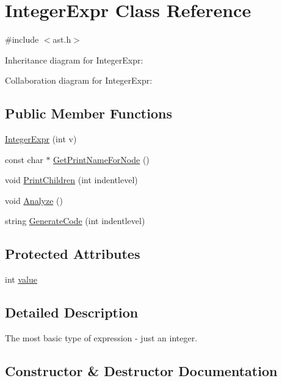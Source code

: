 \hypertarget{class_integer_expr}{}\section{Integer\+Expr Class Reference}
\label{class_integer_expr}


{\ttfamily \#include $<$ast.\+h$>$}



Inheritance diagram for Integer\+Expr\+:


Collaboration diagram for Integer\+Expr\+:
\subsection*{Public Member Functions}
\begin{DoxyCompactItemize}
\item 
\hyperlink{class_integer_expr_a4049bed3df13d005535e73fafe6b1516}{Integer\+Expr} (int v)
\item 
const char $\ast$ \hyperlink{class_integer_expr_a76e0e8357539e515ddac3192ab595fc8}{Get\+Print\+Name\+For\+Node} ()
\item 
void \hyperlink{class_integer_expr_ae8dfeab6ece069ed29c80a5614548268}{Print\+Children} (int indentlevel)
\item 
void \hyperlink{class_integer_expr_a523ca156f0653534b5c142fd496de7a4}{Analyze} ()
\item 
string \hyperlink{class_integer_expr_a72e48794bcd8c04bfeea19d1057636be}{Generate\+Code} (int indentlevel)
\end{DoxyCompactItemize}
\subsection*{Protected Attributes}
\begin{DoxyCompactItemize}
\item 
int \hyperlink{class_integer_expr_af5c4493d7da142825995867fa592c490}{value}
\end{DoxyCompactItemize}


\subsection{Detailed Description}
The most basic type of expression -\/ just an integer. 

\subsection{Constructor \& Destructor Documentation}
\mbox{\label{class_integer_expr_a4049bed3df13d005535e73fafe6b1516}} 
